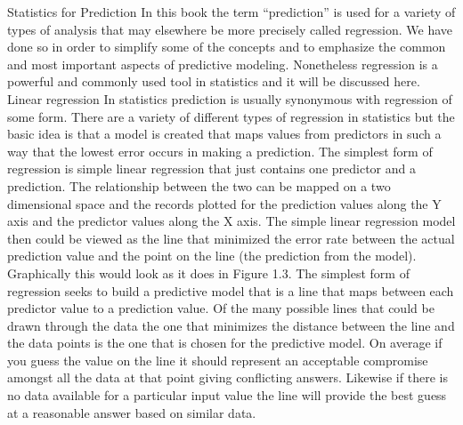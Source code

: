 Statistics for Prediction 
In this book the term “prediction” is used for a variety of types of analysis that may elsewhere be more precisely called regression.  We have done so in order to simplify some of the concepts and to emphasize the common and most important aspects of predictive modeling.  Nonetheless regression is a powerful and commonly used tool in statistics and it will be discussed here.
Linear regression 
In statistics prediction is usually synonymous with regression of some form.   There are a variety of different types of regression in statistics but the basic idea is that a model is created that maps values from predictors in such a way that the lowest error occurs in making a prediction.  The simplest form of regression is simple linear regression that just contains one predictor and a prediction.  The relationship between the two can be mapped on a two dimensional space and the records plotted for the prediction values along the Y axis and the predictor values along the X axis.  The simple linear regression model then could be viewed as the line that minimized the error rate between the actual prediction value and the point on the line (the prediction from the model).  Graphically this would look as it does in Figure 1.3. The simplest form of regression seeks to build a predictive model that is a line that maps between each predictor value to a prediction value.  Of the many possible lines that could be drawn through the data the one that minimizes the distance between the line and the data points is the one that is chosen for the predictive model.
On average if you guess the value on the line it should represent an acceptable compromise amongst all the data at that point giving conflicting answers.  Likewise if there is no data available for a particular input value the line will provide the best guess at a reasonable answer based on similar data.

